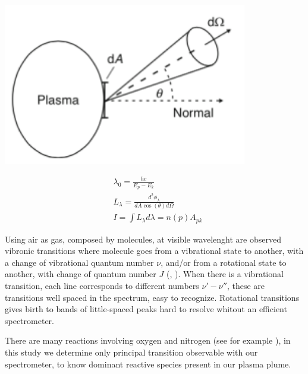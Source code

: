 \begin{minipage}{.48\textwidth}
 \includegraphics[width=0.8\textwidth]{Images/Spectroscopy/plasmaemission.png}
\end{minipage}
\begin{minipage}{.48\textwidth}
\begin{equation}
 \begin{split}
 &\lambda_{0} = \frac{hc}{E_p - E_k} \\
 &L_{\lambda} = \frac{d^2\phi_{\lambda}}{dA \cos(\theta) d\Omega} \\
 &I = \int L_{\lambda} d\lambda = n(p) A_{pk}
 \end{split} 
 \label{eq:emission}
\end{equation}
\end{minipage}


Using air as gas, composed by molecules, at visible wavelenght are observed vibronic transitions where molecule goes from a vibrational state to another, with a change of vibrational quantum number $\nu$, and/or from a rotational state to another, with change of quantum number $J$ (\cite{book:137793}, \cite{wiki:vibronic}). When there is a vibrational transition, each line corresponds to different numbers $\nu'-\nu''$, these are transitions well spaced in the spectrum, easy to recognize. Rotational transitions gives birth to bands of little-spaced peaks hard to resolve whitout an efficient spectrometer.

There are many reactions involving oxygen and nitrogen (see for example \cite{Kossyi_1992}), in this study we determine only principal transition observable with our spectrometer, to know dominant reactive species present in our plasma plume.


